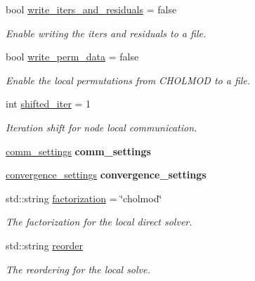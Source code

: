 \begin{DoxyCompactItemize}
bool \hyperlink{structschwz_1_1Settings_a5555cf4340e7918ce22d00b26ccca6a7}{write\+\_\+iters\+\_\+and\+\_\+residuals} = false
\begin{DoxyCompactList}\small\item\em Enable writing the iters and residuals to a file. \end{DoxyCompactList}\item 
\mbox{\label{structschwz_1_1Settings_af692ca8550d16b538dcfddb5208e73f3}} 
bool \hyperlink{structschwz_1_1Settings_af692ca8550d16b538dcfddb5208e73f3}{write\+\_\+perm\+\_\+data} = false
\begin{DoxyCompactList}\small\item\em Enable the local permutations from C\+H\+O\+L\+M\+OD to a file. \end{DoxyCompactList}\item 
\mbox{\label{structschwz_1_1Settings_a33a9382f1b5961a8cb2133cb0c22daf0}} 
int \hyperlink{structschwz_1_1Settings_a33a9382f1b5961a8cb2133cb0c22daf0}{shifted\+\_\+iter} = 1
\begin{DoxyCompactList}\small\item\em Iteration shift for node local communication. \end{DoxyCompactList}\item 
\mbox{\label{structschwz_1_1Settings_a063efd688bb2442d72165d1cbb230fc6}} 
\hyperlink{structschwz_1_1Settings_1_1comm__settings}{comm\+\_\+settings} {\bfseries comm\+\_\+settings}
\item 
\mbox{\label{structschwz_1_1Settings_aba00c697bd92d6ed6332eaaf047c69a0}} 
\hyperlink{structschwz_1_1Settings_1_1convergence__settings}{convergence\+\_\+settings} {\bfseries convergence\+\_\+settings}
\item 
\mbox{\label{structschwz_1_1Settings_a9ac5443eff787613f4f39843cbfa568d}} 
std\+::string \hyperlink{structschwz_1_1Settings_a9ac5443eff787613f4f39843cbfa568d}{factorization} = \char`\"{}cholmod\char`\"{}
\begin{DoxyCompactList}\small\item\em The factorization for the local direct solver. \end{DoxyCompactList}\item 
\mbox{\label{structschwz_1_1Settings_a429197e8093f3f87664ee6c37f91068e}} 
std\+::string \hyperlink{structschwz_1_1Settings_a429197e8093f3f87664ee6c37f91068e}{reorder}
\begin{DoxyCompactList}\small\item\em The reordering for the local solve. \end{DoxyCompactList}\end{DoxyCompactItemize}


